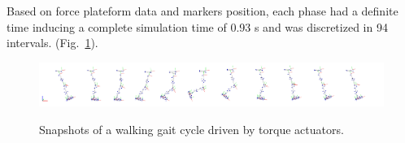 Based on force plateform data and markers position, each phase had a definite time inducing a complete simulation time of 0.93 s and was discretized in 94 intervals.
(Fig.~\ref{fig:snapshots_multiphase_walking_cycle}). 

\begin{figure}[t!]
\centering
\includegraphics[width=\textwidth]{figures/multiphase_walking_cycle.png}\\
\caption{Snapshots of a walking gait cycle driven by torque actuators.}
\label{fig:snapshots_multiphase_walking_cycle}
\end{figure}

